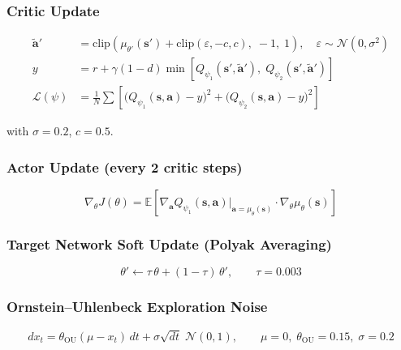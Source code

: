 \documentclass[12pt,a4paper]{article}
\begin{document}
\subsubsection{Critic Update}

\begin{align}
  \tilde{\mathbf{a}}' &= \mathrm{clip}\!\left(
    \mu_{\theta'}(\mathbf{s}') + \mathrm{clip}(\varepsilon,-c,c),\;-1,\;1\right),
    \quad \varepsilon\sim\mathcal{N}(0,\sigma^2) \label{eq:smooth}\\[4pt]
  y &= r + \gamma(1-d)\min\!\left[Q_{\psi_1}(\mathbf{s}',\tilde{\mathbf{a}}'),\;
      Q_{\psi_2}(\mathbf{s}',\tilde{\mathbf{a}}')\right] \label{eq:target_q}\\[4pt]
  \mathcal{L}(\psi) &= \tfrac{1}{N}\sum\!\left[
      \bigl(Q_{\psi_1}(\mathbf{s},\mathbf{a})-y\bigr)^2
    + \bigl(Q_{\psi_2}(\mathbf{s},\mathbf{a})-y\bigr)^2\right] \label{eq:closs}
\end{align}

with $\sigma=0.2$, $c=0.5$.

\subsubsection{Actor Update (every 2 critic steps)}

\begin{equation}
  \nabla_\theta J(\theta)
    = \mathbb{E}\!\left[
      \nabla_{\mathbf{a}}Q_{\psi_1}(\mathbf{s},\mathbf{a})
      \big|_{\mathbf{a}=\mu_\theta(\mathbf{s})}
      \cdot\nabla_\theta\mu_\theta(\mathbf{s})
      \right]
  \label{eq:dpg}
\end{equation}

\subsubsection{Target Network Soft Update (Polyak Averaging)}

\begin{equation}
  \theta' \leftarrow \tau\,\theta + (1-\tau)\,\theta', \qquad \tau = 0.003
  \label{eq:polyak}
\end{equation}

\subsubsection{Ornstein--Uhlenbeck Exploration Noise}

\begin{equation}
  dx_t = \theta_\mathrm{OU}(\mu - x_t)\,dt
         + \sigma\sqrt{dt}\;\mathcal{N}(0,1),
  \qquad \mu=0,\;\theta_\mathrm{OU}=0.15,\;\sigma=0.2
  \label{eq:ou}
\end{equation}
\end{document}
